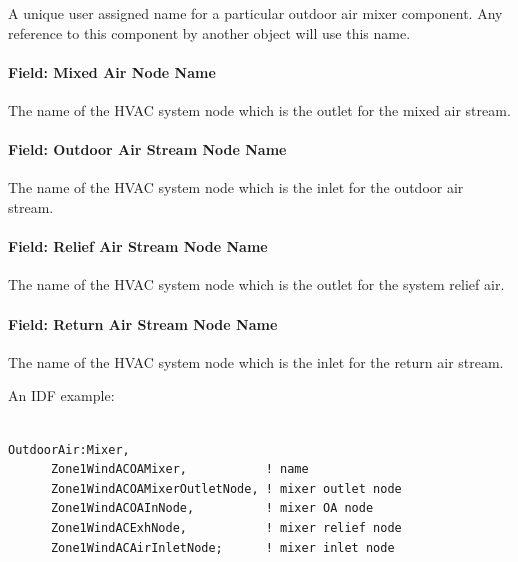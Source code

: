 A unique user assigned name for a particular outdoor air mixer component. Any reference to this component by another object will use this name.

\paragraph{Field: Mixed Air Node Name}\label{field-mixed-air-node-name}

The name of the HVAC system node which is the outlet for the mixed air stream.

\paragraph{Field: Outdoor Air Stream Node Name}\label{field-outdoor-air-stream-node-name}

The name of the HVAC system node which is the inlet for the outdoor air stream.

\paragraph{Field: Relief Air Stream Node Name}\label{field-relief-air-stream-node-name}

The name of the HVAC system node which is the outlet for the system relief air.

\paragraph{Field: Return Air Stream Node Name}\label{field-return-air-stream-node-name}

The name of the HVAC system node which is the inlet for the return air stream.

An IDF example:

\begin{lstlisting}

OutdoorAir:Mixer,
      Zone1WindACOAMixer,           ! name
      Zone1WindACOAMixerOutletNode, ! mixer outlet node
      Zone1WindACOAInNode,          ! mixer OA node
      Zone1WindACExhNode,           ! mixer relief node
      Zone1WindACAirInletNode;      ! mixer inlet node
\end{lstlisting}

